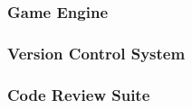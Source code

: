 \subsubsection{Game Engine}


\subsubsection{Version Control System}


\subsubsection{Code Review Suite}

